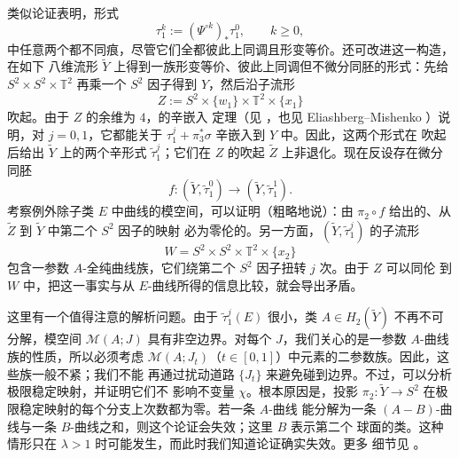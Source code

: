 类似论证表明，形式
\[
  \tau_1^k:=(\Psi^{\circ k})_*\tau_1^0,
  \qquad k\ge0,
\]
中任意两个都不同痕，尽管它们全都彼此上同调且形变等价。还可改进这一构造，在如下
八维流形 $\widetilde Y$ 上得到一族形变等价、彼此上同调但不微分同胚的形式：先给
$S^2\times S^2\times\mathbb T^2$ 再乘一个 $S^2$ 因子得到 $Y$，然后沿子流形
\[
  Z:=S^2\times\{w_1\}\times\mathbb T^2\times\{x_1\}
\]
吹起。由于 $Z$ 的余维为 $4$，的辛嵌入
定理（见 ，也见 Eliashberg--Mishenko ）说明，对
$j=0,1$，它都能关于 $\tau_1^j+\pi_3^*\sigma$ 辛嵌入到 $Y$ 中。因此，这两个形式在
吹起后给出 $\widetilde Y$ 上的两个辛形式 $\widetilde\tau_1^j$；它们在 $Z$ 的吹起
$\widetilde Z$ 上非退化。现在反设存在微分同胚
\[
  f:(\widetilde Y,\widetilde\tau_1^0)
  \longrightarrow(\widetilde Y,\widetilde\tau_1^1).
\]
考察例外除子类 $E$ 中曲线的模空间，可以证明（粗略地说）：由
$\pi_2\circ f$ 给出的、从 $\widetilde Z$ 到 $\widetilde Y$ 中第二个 $S^2$ 因子的映射
必为零伦的。另一方面，$(\widetilde Y,\widetilde\tau_1^j)$ 的子流形
\[
  W=S^2\times S^2\times\mathbb T^2\times\{x_2\}
\]
包含一参数 $A$-全纯曲线族，它们绕第二个 $S^2$ 因子扭转 $j$ 次。由于 $Z$ 可以同伦
到 $W$ 中，把这一事实与从 $E$-曲线所得的信息比较，就会导出矛盾。

这里有一个值得注意的解析问题。由于 $\widetilde\tau_1^j(E)$ 很小，类
$A\in H_2(\widetilde Y)$ 不再不可分解，模空间 $\mathcal M(A;J)$ 具有非空边界。对每个
$J$，我们关心的是一参数 $A$-曲线族的性质，所以必须考虑
$\mathcal M(A;J_t)$（$t\in[0,1]$）中元素的二参数族。因此，这些族一般不紧；我们不能
再通过扰动道路 $\{J_t\}$ 来避免碰到边界。不过，可以分析极限稳定映射，并证明它们不
影响不变量 $\chi$。根本原因是，投影
$\pi_2:\widetilde Y\to S^2$ 在极限稳定映射的每个分支上次数都为零。若一条 $A$-曲线
能分解为一条 $(A-B)$-曲线与一条 $B$-曲线之和，则这个论证会失效；这里 $B$ 表示第二个
球面的类。这种情形只在 $\lambda>1$ 时可能发生，而此时我们知道论证确实失效。更多
细节见 。
